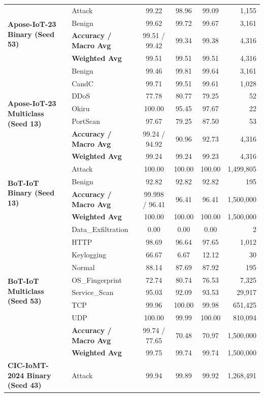 \documentclass[a4paper,fleqn]{cas-sc}
\begin{document}
{\begin{longtable}{llcccr}
\multirow{4}{*}{\textbf{Apose-IoT-23 Binary (Seed 53)}} & Attack & 99.22 & 98.96 & 99.09 & 1,155 \\
 & Benign & 99.62 & 99.72 & 99.67 & 3,161 \\
 & \textbf{Accuracy / Macro Avg} & 99.51 / 99.42 & 99.34 & 99.38 & 4,316 \\
 & \textbf{Weighted Avg} & 99.51 & 99.51 & 99.51 & 4,316 \\
\midrule
\multirow{7}{*}{\textbf{Apose-IoT-23 Multiclass (Seed 13)}} & Benign & 99.46 & 99.81 & 99.64 & 3,161 \\
 & CandC & 99.71 & 99.51 & 99.61 & 1,028 \\
 & DDoS & 77.78 & 80.77 & 79.25 & 52 \\
 & Okiru & 100.00 & 95.45 & 97.67 & 22 \\
 & PortScan & 97.67 & 79.25 & 87.50 & 53 \\
 & \textbf{Accuracy / Macro Avg} & 99.24 / 94.92 & 90.96 & 92.73 & 4,316 \\
 & \textbf{Weighted Avg} & 99.24 & 99.24 & 99.23 & 4,316 \\
\midrule
\multirow{4}{*}{\textbf{BoT-IoT Binary (Seed 13)}} & Attack & 100.00 & 100.00 & 100.00 & 1,499,805 \\
 & Benign & 92.82 & 92.82 & 92.82 & 195 \\
 & \textbf{Accuracy / Macro Avg} & 99.998 / 96.41 & 96.41 & 96.41 & 1,500,000 \\
 & \textbf{Weighted Avg} & 100.00 & 100.00 & 100.00 & 1,500,000 \\
\midrule
\multirow{10}{*}{\textbf{BoT-IoT Multiclass (Seed 53)}} & Data\_Exfiltration & 0.00 & 0.00 & 0.00 & 2 \\
 & HTTP & 98.69 & 96.64 & 97.65 & 1,012 \\
 & Keylogging & 66.67 & 6.67 & 12.12 & 30 \\
 & Normal & 88.14 & 87.69 & 87.92 & 195 \\
 & OS\_Fingerprint & 72.74 & 80.74 & 76.53 & 7,325 \\
 & Service\_Scan & 95.03 & 92.09 & 93.53 & 29,917 \\
 & TCP & 99.96 & 100.00 & 99.98 & 651,425 \\
 & UDP & 100.00 & 99.99 & 100.00 & 810,094 \\
 & \textbf{Accuracy / Macro Avg} & 99.74 / 77.65 & 70.48 & 70.97 & 1,500,000 \\
 & \textbf{Weighted Avg} & 99.75 & 99.74 & 99.74 & 1,500,000 \\
\midrule
\multirow{4}{*}{\textbf{CIC-IoMT-2024 Binary (Seed 43)}} & Attack & 99.94 & 99.89 & 99.92 & 1,268,491 \\

\end{longtable}}
\end{document}
